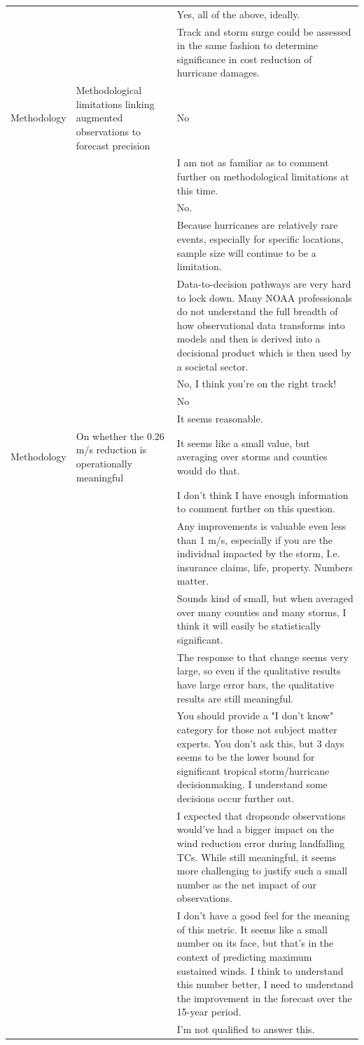 \begin{longtable}[t]{lp{4.2cm}p{8.2cm}}
 &  & Yes, all of the above, ideally.\\
 &  & Track and storm surge could be assessed in the same fashion to determine significance in cost reduction of hurricane damages.\\
\addlinespace
Methodology & Methodological limitations linking augmented observations to forecast precision & No\\
 &  & I am not as familiar as to comment further on methodological limitations at this time.\\
 &  & No.\\
 &  & Because hurricanes are relatively rare events, especially for specific locations, sample size will continue to be a limitation.\\
 &  & Data-to-decision pathways are very hard to lock down. Many NOAA professionals do not understand the full breadth of how observational data transforms into models and then is derived into a decisional product which is then used by a societal sector.\\
\addlinespace
 &  & No, I think you're on the right track!\\
 &  & No\\
 &  & It seems reasonable.\\
Methodology & On whether the 0.26 m/s reduction is operationally meaningful & It seems like a small value, but averaging over storms and counties would do that.\\
 &  & I don't think I have enough information to comment further on this question.\\
\addlinespace
 &  & Any improvements is valuable even less than 1 m/s, especially if you are the individual impacted by the storm, I.e. insurance claims, life, property. Numbers matter.\\
 &  & Sounds kind of small, but when averaged over many counties and many storms, I think it will easily be statistically significant.\\
 &  & The response to that change seems very large, so even if the qualitative results have large error bars, the qualitative results are still meaningful.\\
 &  & You should provide a "I don't know" category for those not subject matter experts. You don't ask this, but 3 days seems to be the lower bound for significant tropical storm/hurricane decisionmaking. I understand some decisions occur further out.\\
 &  & I expected that dropsonde observations would've had a bigger impact on the wind reduction error during landfalling TCs. While still meaningful, it seems more challenging to justify such a small number as the net impact of our observations.\\
\addlinespace
 &  & I don't have a good feel for the meaning of this metric.  It seems like a small number on its face, but that's in the context of predicting maximum sustained winds. I think to understand this number better, I need to understand the improvement in the forecast over the 15-year period.\\
 &  & I'm not qualified to answer this.\\*
\end{longtable}
\endgroup{}

